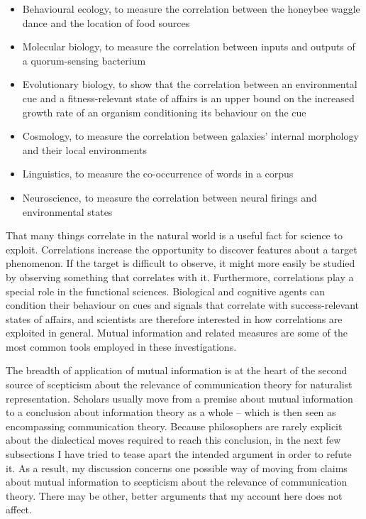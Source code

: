 \begin{itemize}
    \item Behavioural ecology, to measure the correlation between the honeybee waggle dance and the location of food sources \citep{haldane1954statistical}
    \item Molecular biology, to measure the correlation between inputs and outputs of a quorum-sensing bacterium \citep{mehta2009information}
    \item Evolutionary biology, to show that the correlation between an environmental cue and a fitness-relevant state of affairs is an upper bound on the increased growth rate of an organism conditioning its behaviour on the cue \citep{donaldson-matasci2010fitness}
    \item Cosmology, to measure the correlation between galaxies' internal morphology and their local environments \citep{pandey2017how}
    \item Linguistics, to measure the co-occurrence of words in a corpus \citep[$\S$4]{hunston2002corpora}
    \item Neuroscience, to measure the correlation between neural firings and environmental states \citep[][and references therein]{rathkopf2017neural}
\end{itemize}

\noindent That many things correlate in the natural world is a useful fact for science to exploit.
Correlations increase the opportunity to discover features about a target phenomenon.
If the target is difficult to observe, it might more easily be studied by observing something that correlates with it. 
Furthermore, correlations play a special role in the functional sciences.
Biological and cognitive agents can condition their behaviour on cues and signals that correlate with success-relevant states of affairs, and scientists are therefore interested in how correlations are exploited in general.
Mutual information and related measures are some of the most common tools employed in these investigations.

The breadth of application of mutual information is at the heart of the second source of scepticism about the relevance of communication theory for naturalist representation.
Scholars usually move from a premise about mutual information to a conclusion about information theory as a whole -- which is then seen as encompassing communication theory.
Because philosophers are rarely explicit about the dialectical moves required to reach this conclusion, in the next few subsections I have tried to tease apart the intended argument in order to refute it.
As a result, my discussion concerns one possible way of moving from claims about mutual information to scepticism about the relevance of communication theory.
There may be other, better arguments that my account here does not affect.

